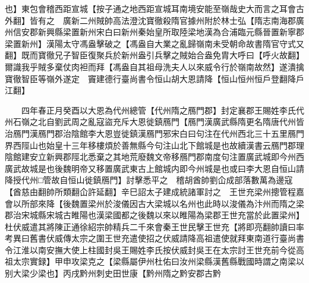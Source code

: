 也】東包會稽西距宣城【按子通之地西距宣城耳南境安能至嶺哉史大而言之耳會古外翻】皆有之　廣新二州賊帥高法澄沈寶徹殺隋官據州附於林士弘【隋志南海郡廣州信安郡新興縣梁置新州宋白曰新州秦始皇所取陸梁地漢為合浦臨元縣晉置新寧郡梁置新州】漢陽太守馮盎擊破之【馮盎自大業之亂歸嶺南未受朝命故書隋官守式又翻】既而寶徹兄子智臣復聚兵於新州盎引兵擊之賊始合盎免胄大呼曰【呼火故翻】爾識我乎賊多棄仗肉袒而拜【馮盎自其祖母洗夫人以來威令行於嶺南故然】遂潰擒寶徹智臣等嶺外遂定　竇建德行臺尚書令恒山胡大恩請降【恒山恒州恒戶登翻降戶江翻】

　　四年春正月癸酉以大恩為代州總管【代州隋之鴈門郡】封定襄郡王賜姓李氏代州石嶺之北自劉武周之亂寇盜充斥大恩徙鎮鴈門【鴈門漢廣武縣隋更名隋唐代州皆治鴈門漢鴈門郡治陰館李大恩豈徙鎮漢鴈門邪宋白曰句注在代州西北三十五里鴈門界西陘山也始皇十三年移樓煩於善無縣今句注山北下館城是也故續漢書云鴈門郡理陰館建安立新興郡陘北悉棄之其地荒廢魏文帝移鴈門郡南度句注置廣武城即今州西廣武故城是也後魏明帝又移置廣武東古上館城内即今州城是也或曰李大恩自恒山請降授代州□管故自恒山徙鎮鴈門】討擊悉平之　稽胡酋帥劉仚成部落數萬為邊寇【酋慈由翻帥所類翻仚許延翻】辛巳詔太子建成統諸軍討之　王世充梁州摠管程嘉會以所部來降【後魏置梁州於浚儀因古大梁城以名州也此時以浚儀為汴州而隋之梁郡治宋城縣宋城古睢陽也漢梁國都之後魏以來以睢陽為梁郡王世充當於此置梁州】　杜伏威遣其將陳正通徐紹宗帥精兵二千來會秦王世民擊王世充【將即亮翻帥讀曰率　考異曰舊書伏威傳太宗之圍王世充遣使招之伏威請降高祖遣使就拜東南道行臺尚書令江淮以南安撫大使上柱國封吳王賜姓李氏按伏威封吳王在太宗討王世充前今從高祖太宗實録】甲申攻梁克之【梁縣屬伊州杜佑曰汝州梁縣漢舊縣戰國時謂之南梁以别大梁少梁也】丙戌黔州刺史田世康【黔州隋之黔安郡古黔